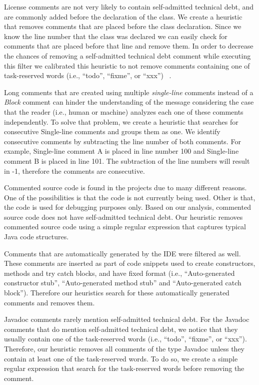 License comments are not very likely to contain self-admitted technical debt, and are commonly added before the declaration of the class. We create a heuristic that removes comments that are placed before the class declaration. Since we know the line number that the class was declared we can easily check for comments that are placed before that line and remove them. In order to decrease the chances of removing a self-admitted technical debt comment while executing this filter we calibrated this heuristic to not remove comments containing one of task-reserved words (i.e., ``todo'', ``fixme'', or ``xxx'') ~\cite{Storey2008ICSE}.

Long comments that are created using multiple \emph{single-line} comments instead of a \emph{Block} comment can hinder the understanding of the message considering the case that the reader (i.e., human or machine) analyzes each one of these comments independently. To solve that problem, we create a heuristic that searches for consecutive Single-line comments and groups them as one. We identify consecutive comments by subtracting the line number of both comments. For example, Single-line comment A is placed in line number 100 and Single-line comment B is placed in line 101. The subtraction of the line numbers will result in -1, therefore the comments are consecutive.
 
Commented source code is found in the projects due to many different reasons. One of the possibilities is that the code is not currently being used. Other is that, the code is used for debugging purposes only. Based on our analysis, commented source code does not have self-admitted technical debt. Our heuristic removes commented source code using a simple regular expression that captures typical Java code structures.

Comments that are automatically generated by the IDE were filtered as well. These comments are inserted as part of code snippets used to create constructors, methods and try catch blocks, and have fixed format (i.e., ``Auto-generated constructor stub'', ``Auto-generated method stub'' and ``Auto-generated catch block''). Therefore our heuristics search for these automatically generated comments and removes them. 

Javadoc comments rarely mention self-admitted technical debt. For the Javadoc comments that do mention self-admitted technical debt, we notice that they usually contain one of the task-reserved words (i.e., ``todo'', ``fixme'', or ``xxx''). Therefore, our heuristic removes all comments of the type Javadoc unless they contain at least one of the task-reserved words. To do so, we create a simple regular expression that search for the task-reserved words before removing the comment.  

